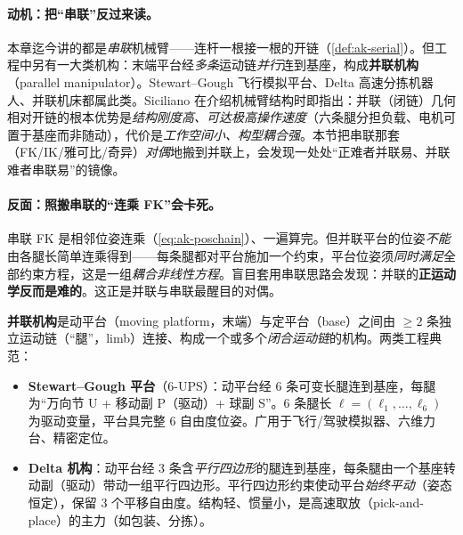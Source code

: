 \paragraph{动机：把“串联”反过来读。}
本章迄今讲的都是\emph{串联}机械臂——连杆一根接一根的开链（\cref{def:ak-serial}）。但工程中另有一大类机构：末端平台经\emph{多条}运动链\emph{并行}连到基座，构成\textbf{并联机构}（parallel manipulator）。Stewart--Gough 飞行模拟平台、Delta 高速分拣机器人、并联机床都属此类。Siciliano 在介绍机械臂结构时即指出\cite{siciliano2009robotics}：并联（闭链）几何相对开链的根本优势是\emph{结构刚度高、可达极高操作速度}（六条腿分担负载、电机可置于基座而非随动），代价是\emph{工作空间小、构型耦合强}。本节把串联那套（FK/IK/雅可比/奇异）\emph{对偶}地搬到并联上，会发现一处处“正难者并联易、并联难者串联易”的镜像。

\paragraph{反面：照搬串联的“连乘 FK”会卡死。}
串联 FK 是相邻位姿连乘（\cref{eq:ak-poschain}）、一遍算完。但并联平台的位姿\emph{不能}由各腿长简单连乘得到——每条腿都对平台施加一个约束，平台位姿须\emph{同时满足}全部约束方程，这是一组\emph{耦合非线性方程}。盲目套用串联思路会发现：并联的\textbf{正运动学反而是难的}。这正是并联与串联最醒目的对偶。

\begin{definition}[并联机构与两类典型]\label{def:ak-parallel}
\textbf{并联机构}是动平台（moving platform，末端）与定平台（base）之间由 $\ge2$ 条独立运动链（“腿”，limb）连接、构成一个或多个\emph{闭合运动链}的机构。两类工程典范\cite{siciliano2009robotics,merlet2006parallel}：
\begin{itemize}
  \item \textbf{Stewart--Gough 平台}（6\nobreakdash-UPS）：动平台经 6 条可变长腿连到基座，每腿为“万向节 U + 移动副 P（驱动）+ 球副 S”。6 条腿长 $\boldsymbol{\ell}=(\ell_1,\dots,\ell_6)$ 为驱动变量，平台具完整 6 自由度位姿。广用于飞行/驾驶模拟器、六维力台、精密定位。
  \item \textbf{Delta 机构}：动平台经 3 条含\emph{平行四边形}的腿连到基座，每条腿由一个基座转动副（驱动）带动一组平行四边形。平行四边形约束使动平台\emph{始终平动}（姿态恒定），保留 3 个平移自由度。结构轻、惯量小，是高速取放（pick-and-place）的主力（如包装、分拣）。
\end{itemize}
\end{definition}

